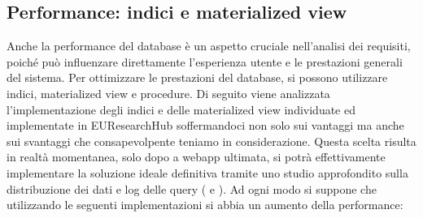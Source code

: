 \documentclass{report}
\begin{document}
\subsection{Performance: indici e  materialized view }
Anche la performance del database è un aspetto cruciale nell'analisi dei requisiti, poiché può influenzare direttamente l'esperienza utente e le prestazioni generali del sistema. Per ottimizzare le prestazioni del database, si possono utilizzare indici, materialized view e procedure. Di seguito viene analizzata l'implementazione degli indici e delle materialized view individuate ed implementate in EUResearchHub soffermandoci non solo sui vantaggi ma anche sui svantaggi che consapevolpente teniamo in considerazione.  Questa scelta risulta in realtà momentanea, solo dopo a webapp ultimata, si potrà effettivamente implementare la soluzione ideale definitiva tramite uno studio approfondito sulla distribuzione dei dati e log delle query (  e ). 
Ad ogni modo si suppone che utilizzando le seguenti implementazioni si abbia un aumento della performance:
\end{document}
